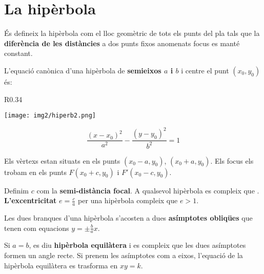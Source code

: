 \documentclass[11pt, a4paper, pdf]{article}
\begin{document}
\section{La hipèrbola}
\begin{theorybox}
	
	És defineix la hipèrbola com el lloc geomètric de tots els punts del pla
	tals que la \textbf{diferència de les distàncies} a dos punts fixos anomenats focus es manté constant.
	
	L'equació canònica d'una hipèrbola de \textbf{semieixos $a$ i $b$} i centre el punt $(x_0, y_0)$ és:
	\begin{wrapfigure}{R}{0.34\textwidth} 
		\vspace{-1cm}
		\begin{center}
			\texttt{[image: img2/hiperb2.png]}
		\end{center}
		\vspace{-1cm}
	\end{wrapfigure}
	\begin{equation}
	\label{eq:hiperbola-canonica}
	\frac{(x-x_0)^2}{a^2}-\frac{(y-y_0)^2}{b^2}=1
	\end{equation} 
	
	Els vèrtexs estan situats en els punts $(x_0-a, y_0)$, $(x_0+a, y_0)$. Els focus els trobam en els punts $F(x_0+c, y_0)$ i $F'(x_0-c,y_0)$.
	
	Definim $c$ com la \textbf{semi-distància focal}. A qualsevol hipèrbola es compleix que  . \textbf{L'excentricitat} $e=\frac{c}{a}$ per una hipèrbola compleix que $e>1$. 
	
	
	
	Les dues branques d'una hipèrbola s'acosten a dues \textbf{asímptotes obliqües} que tenen com equacions $\boxed{y=\pm \frac{b}{a} x}$. 
	
	Si $a=b$, es diu \textbf{hipèrbola equilàtera} i es compleix que les dues asímptotes formen un angle recte. Si prenem les asímptotes com a eixos, l'equació de la hipèrbola equilàtera es trasforma en $xy=k$.
\end{theorybox}
\end{document}
